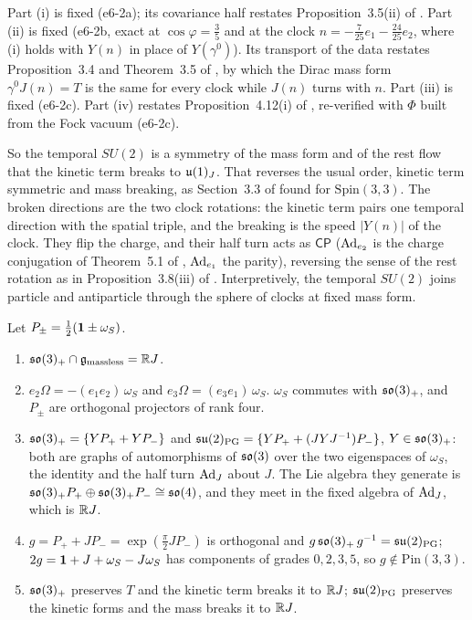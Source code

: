 Part (i) is fixed (e6-2a); its covariance half restates Proposition~3.5(ii) of \cite{RE}. Part (ii) is fixed (e6-2b, exact at $\cos\varphi=\tfrac35$
and at the clock $n=-\tfrac7{25}e_1-\tfrac{24}{25}e_2$, where (i) holds with $Y(n)$ in place of $Y(\gamma^0)$). Its transport of the data restates
Proposition~3.4 and Theorem~3.5 of \cite{TR}, by which the Dirac mass form $\gamma^0J(n)=T$ is the same for every clock while $J(n)$ turns with $n$.
Part (iii) is fixed (e6-2c). Part (iv) restates Proposition~4.12(i) of \cite{TR}, re-verified with $\Phi$ built from the Fock vacuum (e6-2c).

So the temporal $SU(2)$ is a symmetry of the mass form and of the rest flow that the kinetic term breaks to $\mathfrak{u}(1)_J$. That reverses the usual
order, kinetic term symmetric and mass breaking, as Section~3.3 of \cite{RE} found for $\mathrm{Spin}(3,3)$. The broken directions are the two clock
rotations: the kinetic term pairs one temporal direction with the spatial triple, and the breaking is the speed $|Y(n)|$ of the clock. They flip the
charge, and their half turn acts as $\mathsf{CP}$ ($\operatorname{Ad}_{e_2}$ is the charge conjugation of Theorem~5.1 of \cite{ES17}, $\operatorname{Ad}_{e_1}$ the parity), reversing
the sense of the rest rotation as in Proposition~3.8(iii) of \cite{RE}. Interpretively, the temporal $SU(2)$ joins particle and antiparticle through
the sphere of clocks at fixed mass form.

\begin{proposition}
\label{e6:prop:twosu2}
Let $P_\pm=\tfrac12(\mathbf 1\pm\omega_S)$.
\begin{enumerate}[label=(\roman*),leftmargin=2.2em]
\item $\mathfrak{so}(3)_+\cap\mathfrak g_{\rm massless}=\mathbb{R} J$.
\item $e_2\Omega=-(e_1e_2)\,\omega_S$ and $e_3\Omega=(e_3e_1)\,\omega_S$. $\omega_S$ commutes with $\mathfrak{so}(3)_+$, and $P_\pm$ are orthogonal projectors of rank four.
\item $\mathfrak{so}(3)_+=\{YP_++YP_-\}$ and $\mathfrak{su}(2)_{\rm PG}=\{YP_++(JYJ^{-1})P_-\}$, $Y\in\mathfrak{so}(3)_+$: both are graphs of automorphisms of $\mathfrak{so}(3)$ over the two
eigenspaces of $\omega_S$, the identity and the half turn $\operatorname{Ad}_J$ about $J$. The Lie algebra they generate is $\mathfrak{so}(3)_+P_+\oplus\mathfrak{so}(3)_+P_-\cong\mathfrak{so}(4)$, and they
meet in the fixed algebra of $\operatorname{Ad}_J$, which is $\mathbb{R} J$.
\item $g=P_++JP_-=\exp(\tfrac\pi2JP_-)$ is orthogonal and $g\,\mathfrak{so}(3)_+\,g^{-1}=\mathfrak{su}(2)_{\rm PG}$; $2g=\mathbf 1+J+\omega_S-J\omega_S$ has components of grades $0,2,3,5$,
so $g\notin\mathrm{Pin}(3,3)$.
\item $\mathfrak{so}(3)_+$ preserves $T$ and the kinetic term breaks it to $\mathbb{R} J$; $\mathfrak{su}(2)_{\rm PG}$ preserves the kinetic forms and the mass breaks it to $\mathbb{R} J$.
\end{enumerate}
\end{proposition}

